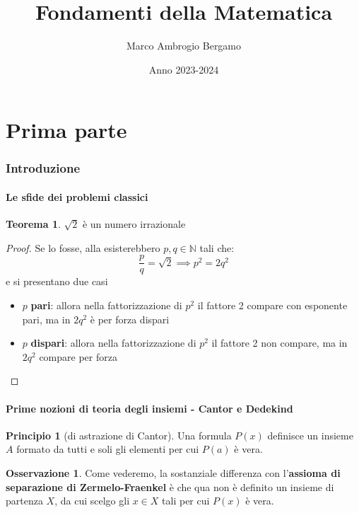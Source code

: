 \documentclass[a4paper,10pt]{article}
\title{\textbf{Fondamenti della Matematica}}
\author{Marco Ambrogio Bergamo}
\date{Anno 2023-2024}
\theoremstyle{definition}
\theoremstyle{indentdefinition}
\theoremstyle{indentpostulate}
\newtheorem{princ}{Principio}[section]
\theoremstyle{indenttheorem}
\newtheorem{thm}{Teorema}[section]
\theoremstyle{myremark}
\newtheorem*{rem*}{Osservazione}
\theoremstyle{indentgeneral}
\begin{document}
\setlength{\parindent}{0pt}
\maketitle
\newpage
\tableofcontents{}

\pagebreak{}
\part{Prima parte}
\section{Introduzione}
\subsection{Le sfide dei problemi classici}
\begin{thm}
    $\sqrt{2}$ è un numero irrazionale
\end{thm}
\begin{proof}
    Se lo fosse, alla esisterebbero $p,q\in \mathbb{N}$ tali che:
    $$\frac{p}{q}=\sqrt{2}\implies p^2=2q^2$$
    e si presentano due casi
\begin{itemize}
    \item $p$ \textbf{pari}: allora nella fattorizzazione di $p^2$ il fattore 2 compare con esponente pari, ma in $2q^2$ è per forza dispari \lightning
    \item $p$ \textbf{dispari}: allora nella fattorizzazione di $p^2$ il fattore 2 non compare, ma in $2q^2$ compare per forza \lightning
\end{itemize}
\end{proof}

\subsection{Prime nozioni di teoria degli insiemi - Cantor e Dedekind}

\begin{princ}[di astrazione di Cantor]
    Una formula $P(x)$ definisce un insieme $A$ formato da tutti e soli gli elementi per cui $P(a)$ è vera.
\end{princ}

\begin{rem*}
    Come vederemo, la sostanziale differenza con l'\textbf{assioma di separazione di Zermelo-Fraenkel} è che qua non è definito un insieme di partenza $X$, da cui scelgo gli $x\in X$ tali per cui $P(x)$ è vera.
\end{rem*}
\end{document}
